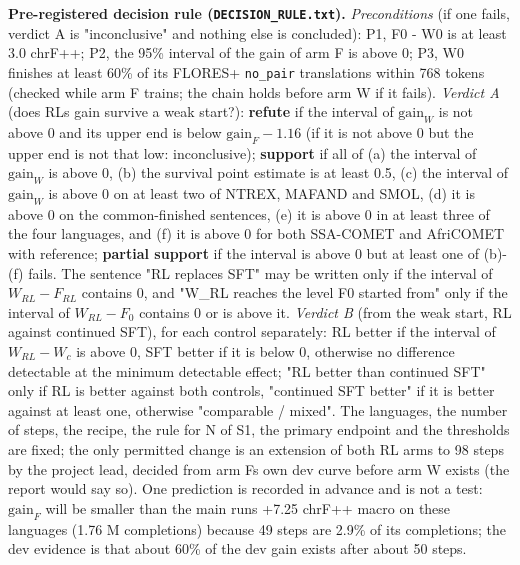 \textbf{Pre-registered decision rule (\texttt{DECISION\_RULE.txt}).} \emph{Preconditions} (if one fails, verdict A is "inconclusive" and nothing else is concluded): P1, F0 - W0 is at least 3.0 chrF++; P2, the 95\% interval of the gain of arm F is above 0; P3, W0 finishes at least 60\% of its FLORES+ \texttt{no\_pair} translations within 768 tokens (checked while arm F trains; the chain holds before arm W if it fails). \emph{Verdict A} (does RL\textquotesingle s gain survive a weak start?): \textbf{refute} if the interval of \(\text{gain}_W\) is not above 0 and its upper end is below \(\text{gain}_F-1.16\) (if it is not above 0 but the upper end is not that low: inconclusive); \textbf{support} if all of (a) the interval of \(\text{gain}_W\) is above 0, (b) the survival point estimate is at least 0.5, (c) the interval of \(\text{gain}_W\) is above 0 on at least two of NTREX, MAFAND and SMOL, (d) it is above 0 on the common-finished sentences, (e) it is above 0 in at least three of the four languages, and (f) it is above 0 for both SSA-COMET and AfriCOMET with reference; \textbf{partial support} if the interval is above 0 but at least one of (b)-(f) fails. The sentence "RL replaces SFT" may be written only if the interval of \(W_{RL}-F_{RL}\) contains 0, and "W\_RL reaches the level F0 started from" only if the interval of \(W_{RL}-F_0\) contains 0 or is above it. \emph{Verdict B} (from the weak start, RL against continued SFT), for each control separately: RL better if the interval of \(W_{RL}-W_c\) is above 0, SFT better if it is below 0, otherwise no difference detectable at the minimum detectable effect; "RL better than continued SFT" only if RL is better against both controls, "continued SFT better" if it is better against at least one, otherwise "comparable / mixed". The languages, the number of steps, the recipe, the rule for N of S1, the primary endpoint and the thresholds are fixed; the only permitted change is an extension of both RL arms to 98 steps by the project lead, decided from arm F\textquotesingle s own dev curve before arm W exists (the report would say so). One prediction is recorded in advance and is not a test: \(\text{gain}_F\) will be smaller than the main run\textquotesingle s +7.25 chrF++ macro on these languages (1.76 M completions) because 49 steps are 2.9\% of its completions; the dev evidence is that about 60\% of the dev gain exists after about 50 steps.

